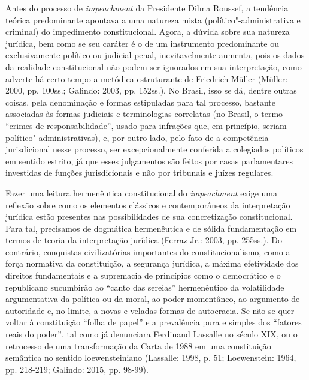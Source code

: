Antes do processo de \emph{impeachment} da Presidente Dilma Roussef, a
tendência teórica predominante apontava a uma natureza mista
(político"-administrativa e criminal) do impedimento constitucional.
Agora, a dúvida sobre sua natureza jurídica, bem como se seu caráter é o
de um instrumento predominante ou exclusivamente político ou judicial
penal, inevitavelmente aumenta, pois os dados da realidade
constitucional não podem ser ignorados em sua interpretação, como
adverte há certo tempo a metódica estruturante de Friedrich Müller
(Müller: 2000, pp. 100ss.; Galindo: 2003, pp. 152ss.). No Brasil, isso
se dá, dentre outras coisas, pela denominação e formas estipuladas para
tal processo, bastante associadas às formas judiciais e terminologias
correlatas (no Brasil, o termo ``crimes de responsabilidade'', usado
para infrações que, em princípio, seriam político"-administrativas), e,
por outro lado, pelo fato de a competência jurisdicional nesse processo,
ser excepcionalmente conferida a colegiados políticos em sentido
estrito, já que esses julgamentos são feitos por casas parlamentares
investidas de funções jurisdicionais e não por tribunais e juízes
regulares.

Fazer uma leitura hermenêutica constitucional do \emph{impeachment}
exige uma reflexão sobre como os elementos clássicos e contemporâneos da
interpretação jurídica estão presentes nas possibilidades de sua
concretização constitucional. Para tal, precisamos de dogmática
hermenêutica e de sólida fundamentação em termos de teoria da
interpretação jurídica (Ferraz Jr.: 2003, pp. 255ss.). Do contrário,
conquistas civilizatórias importantes do constitucionalismo, como a
força normativa da constituição, a segurança jurídica, a máxima
efetividade dos direitos fundamentais e a supremacia de princípios como
o democrático e o republicano sucumbirão ao ``canto das sereias''
hermenêutico da volatilidade argumentativa da política ou da moral, ao
poder momentâneo, ao argumento de autoridade e, no limite, a novas e
veladas formas de autocracia. Se não se quer voltar à constituição
``folha de papel'' e a prevalência pura e simples dos ``fatores reais do
poder'', tal como já denunciara Ferdinand Lassalle no século XIX, ou o
retrocesso de uma transformação da Carta de 1988 em uma constituição
semântica no sentido loewensteiniano (Lassalle: 1998, p. 51;
Loewenstein: 1964, pp. 218-219; Galindo: 2015, pp. 98-99).

